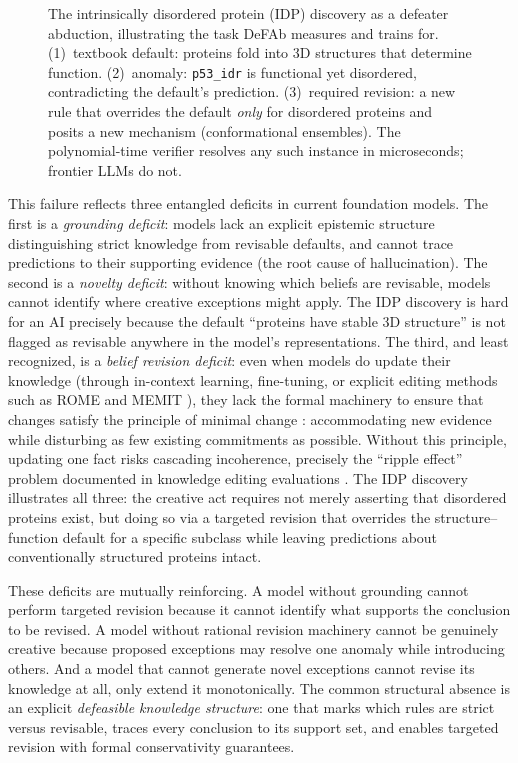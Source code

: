 \documentclass{article}
\theoremstyle{definition}
\begin{document}
\begin{figure}[t]
\centering
\resizebox{\textwidth}{!}{}
\caption{The intrinsically disordered protein (IDP) discovery as a defeater abduction, illustrating the task DeFAb measures and trains for. (1)~textbook default: proteins fold into 3D structures that determine function. (2)~anomaly: \texttt{p53\_idr} is functional yet disordered, contradicting the default's prediction. (3)~required revision: a new rule that overrides the default \emph{only} for disordered proteins and posits a new mechanism (conformational ensembles). The polynomial-time verifier resolves any such instance in microseconds; frontier LLMs do not.}
\label{fig:intuition}
\end{figure}

This failure reflects three entangled deficits in current foundation models. The first is a \textit{grounding deficit}: models lack an explicit epistemic structure distinguishing strict knowledge from revisable defaults, and cannot trace predictions to their supporting evidence (the root cause of hallucination). The second is a \textit{novelty deficit}: without knowing which beliefs are revisable, models cannot identify where creative exceptions might apply. The IDP discovery is hard for an AI precisely because the default ``proteins have stable 3D structure'' is not flagged as revisable anywhere in the model's representations. The third, and least recognized, is a \textit{belief revision deficit}: even when models do update their knowledge (through in-context learning, fine-tuning, or explicit editing methods such as ROME \cite{meng2022locating} and MEMIT \cite{meng2023mass}), they lack the formal machinery to ensure that changes satisfy the principle of minimal change \cite{alchourron1985logic, dalal1988investigations}: accommodating new evidence while disturbing as few existing commitments as possible. Without this principle, updating one fact risks cascading incoherence, precisely the ``ripple effect'' problem documented in knowledge editing evaluations \cite{cohen2024evaluating}. The IDP discovery illustrates all three: the creative act requires not merely asserting that disordered proteins exist, but doing so via a targeted revision that overrides the structure--function default for a specific subclass while leaving predictions about conventionally structured proteins intact.

These deficits are mutually reinforcing. A model without grounding cannot perform targeted revision because it cannot identify what supports the conclusion to be revised. A model without rational revision machinery cannot be genuinely creative because proposed exceptions may resolve one anomaly while introducing others. And a model that cannot generate novel exceptions cannot revise its knowledge at all, only extend it monotonically. The common structural absence is an explicit \emph{defeasible knowledge structure}: one that marks which rules are strict versus revisable, traces every conclusion to its support set, and enables targeted revision with formal conservativity guarantees.
\end{document}
